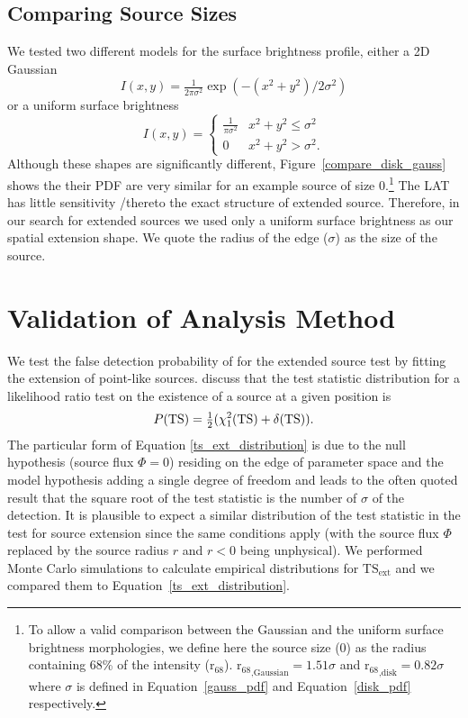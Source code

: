 \documentclass[12pt,preprint]{aastex}
\newcommand{\tsext}{{\ensuremath{\text{TS}_{\text{ext}}}}\xspace}
\newcommand{\rsixeight}{{\ensuremath{\text{r}_{68}}}\xspace}
\newcommand{\ts}{\text{TS}\xspace}
\begin{document}
\subsection{Comparing Source Sizes}

\label{compare_source_size}

We tested two different models for the
surface brightness profile, either a 2D Gaussian
\begin{equation}\label{gauss_pdf}
  I(x,y)=\tfrac{1}{2\pi\sigma^2}\exp\left(-(x^2+y^2)/2\sigma^2\right)
\end{equation}
or a uniform surface brightness
\begin{equation}\label{disk_pdf}
  I(x,y)=
  \begin{cases}
    \frac{1}{\pi\sigma^2} & x^2+y^2\le\sigma^2 \\
    0                      & x^2+y^2>\sigma^2.
  \end{cases}
\end{equation}
Although these shapes are significantly different, 
Figure~\ref{compare_disk_gauss} shows the their PDF 
are very similar for an example source of size
0.\footnote{To
allow a valid comparison between the Gaussian and the uniform surface
brightness morphologies,
we define here the source size (0) 
as the radius containing
68\% of the intensity ($\rsixeight$).  $\rsixeight_\text{,Gaussian}=1.51\sigma$
and $\rsixeight_\text{,disk}=0.82\sigma$ where $\sigma$
is defined in Equation~\ref{gauss_pdf} and
Equation~\ref{disk_pdf} respectively.} The LAT 
has little sensitivity /thereto the exact structure of extended source.
Therefore, in our search for extended sources we used only a uniform
surface brightness as our spatial extension shape. We quote the radius
of the edge ($\sigma$) as the size of the source.

\section{Validation of Analysis Method}

\label{monte_carlo_validation}

We test the false detection probability of for the
extended source test by fitting the extension of
point-like sources.
\cite{mattox_egret} discuss that the test statistic distribution
for a likelihood ratio test on the existence of a source at
a given position is 
\begin{equation}\label{ts_ext_distribution}
  P(\ts)=\onehalf(\chi^2_1(\ts)+\delta(\ts)).
\end{equation}
The particular form of Equation \ref{ts_ext_distribution} is
due to the null hypothesis (source flux $\Phi=0$) residing
on the edge of parameter space and the model hypothesis
adding a single degree of freedom
and leads to the often quoted result that the square root
of the test statistic is the number of $\sigma$ of
the detection. It is plausible to
expect a similar distribution of the test statistic
in the test for source extension since the same conditions
apply (with the source flux $\Phi$ replaced by the source radius $r$ and
$r<0$ being unphysical).
We performed Monte Carlo
simulations
to calculate empirical distributions for $\tsext$ and
we compared them to Equation~\ref{ts_ext_distribution}.
\end{document}
